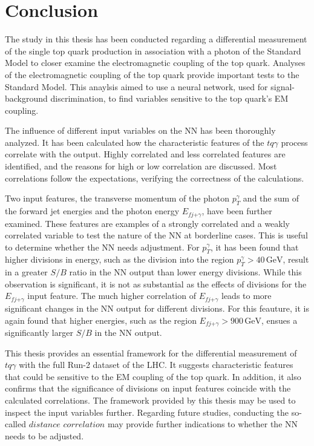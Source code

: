 \chapter{Conclusion}
The study in this thesis has been conducted regarding a differential measurement of the single top quark production in association with a photon of the Standard Model to closer examine the electromagnetic coupling of the top quark. 
Analyses of the electromagnetic coupling of the top quark provide important tests to the Standard Model. This anaylsis aimed to use a neural network, used for signal-background discrimination, to find variables sensitive to the top quark's EM coupling. 

The influence of different input variables on the NN has been thoroughly analyzed. It has been calculated how the characteristic features of the $tq\gamma$ process 
correlate with the output. Highly correlated and less correlated features are identified, and the reasons for high or low correlation are discussed. 
Most correlations follow the expectations, verifying the correctness of the calculations. 

Two input features, the transverse momentum of the photon $p_T^\gamma$ and the sum of the forward jet energies and the photon energy $E_{fj\text{+}\gamma}$, have been further examined. 
These features are examples of a strongly correlated and a weakly correlated variable to test the nature of the NN at borderline cases. This is useful to determine whether the NN needs adjustment. 
For $p_T^\gamma$, it has been found that higher divisions in energy, such as the division into the region $p_T^\gamma > 40 \,\si{\giga\electronvolt}$, result in a greater $S/B$ ratio in the NN output than lower energy divisions. 
While this observation is significant, it is not as substantial as the effects of divisions for the $E_{fj\text{+}\gamma}$ input feature. The much higher correlation of $E_{fj\text{+}\gamma}$ leads to more significant changes in the NN output for different divisions. 
For this feauture, it is again found that higher energies, such as the region $E_{fj\text{+}\gamma} > 900 \,\si{\giga\electronvolt}$, ensues a significantly larger $S/B$ in the NN output. 

This thesis provides an essential framework for the differential measurement of $tq\gamma$ with the full Run-2 dataset of the LHC. It suggests characteristic features that could be sensitive to the EM coupling of the top quark. 
In addition, it also confirms that the significance of divisions on input features coincide with the calculated correlations. 
The framework provided by this thesis may be used to inspect the input variables further. 
Regarding future studies, conducting the so-called $distance$ $correlation$ \cite{distcorr} may provide further indications to whether the NN needs to be adjusted. 